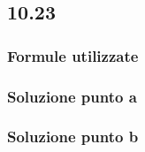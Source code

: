 \documentclass[../../main.tex]{subfiles}
\begin{document}
\subsection*{10.23}
\subsubsection*{Formule utilizzate}
\subsubsection*{Soluzione punto a}
\subsubsection*{Soluzione punto b}
\newpage
\end{document}
